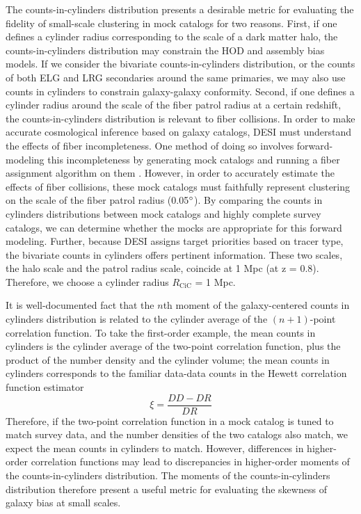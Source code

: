 \documentclass[fleqn,usenatbib]{mnras}
\begin{document}
The counts-in-cylinders distribution presents a desirable metric for evaluating the fidelity of small-scale clustering in mock catalogs for two reasons. First, if one defines a cylinder radius corresponding to the scale of a dark matter halo, the counts-in-cylinders distribution may constrain the HOD and assembly bias models. If we consider the bivariate counts-in-cylinders distribution, or the counts of both ELG and LRG secondaries around the same primaries, we may also use counts in cylinders to constrain galaxy-galaxy conformity. Second, if one defines a cylinder radius around the scale of the fiber patrol radius at a certain redshift, the counts-in-cylinders distribution is relevant to fiber collisions. In order to make accurate cosmological inference based on galaxy catalogs, DESI must understand the effects of fiber incompleteness. One method of doing so involves forward-modeling this incompleteness by generating mock catalogs and running a fiber assignment algorithm on them \citep{bianchi_characterization_2025}. However, in order to accurately estimate the effects of fiber collisions, these mock catalogs must faithfully represent clustering on the scale of the fiber patrol radius (0.05$\degree$). By comparing the counts in cylinders distributions between mock catalogs and highly complete survey catalogs, we can determine whether the mocks are appropriate for this forward modeling. Further, because DESI assigns target priorities based on tracer type, the bivariate counts in cylinders offers pertinent information. These two scales, the halo scale and the patrol radius scale, coincide at 1 Mpc (at z = 0.8). Therefore, we choose a cylinder radius $R_{\text{CiC}}$ = 1 Mpc.

It is well-documented fact that the $n$th moment of the galaxy-centered counts in cylinders distribution is related to the cylinder average of the $(n+1)$-point correlation function. To take the first-order example, the mean counts in cylinders is the cylinder average of the two-point correlation function, plus the product of the number density and the cylinder volume; the mean counts in cylinders corresponds to the familiar data-data counts in the Hewett correlation function estimator
\begin{equation}
\xi = \frac{DD - DR}{DR}
\end{equation}
Therefore, if the two-point correlation function in a mock catalog is tuned to match survey data, and the number densities of the two catalogs also match, we expect the mean counts in cylinders to match. However, differences in higher-order correlation functions may lead to discrepancies in higher-order moments of the counts-in-cylinders distribution. The moments of the counts-in-cylinders distribution therefore present a useful metric for evaluating the skewness of galaxy bias at small scales.
\end{document}
